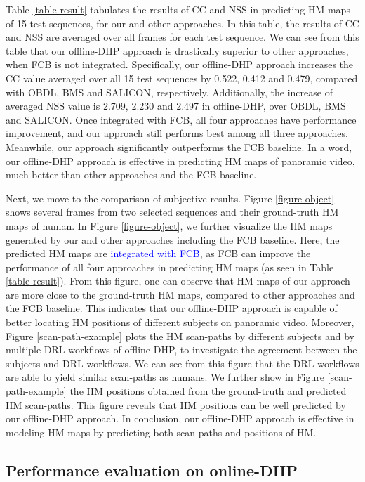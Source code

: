 \documentclass[10pt,journal,compsoc]{IEEEtran}
\begin{document}
Table \ref{table-result} tabulates the results of CC and NSS in predicting HM maps of 15 test sequences, for our and other approaches.
In this table, the results of CC and NSS are averaged over all frames for each test sequence.
We can see from this table that our offline-DHP approach is drastically superior to other approaches, when FCB is not integrated.
Specifically, our  offline-DHP approach increases the CC value averaged over all 15 test sequences by 0.522, 0.412 and 0.479, compared with OBDL, BMS and SALICON, respectively.
Additionally, the increase of averaged NSS value is 2.709, 2.230 and 2.497 in offline-DHP, over OBDL, BMS and SALICON.
Once integrated with FCB, all four approaches have performance improvement, and our approach still performs best among all three approaches. Meanwhile, our approach significantly outperforms the FCB baseline.
In a word, our offline-DHP approach is effective in predicting HM maps of panoramic video, much better than other approaches and the FCB baseline.


Next, we move to the comparison of subjective results. Figure \ref{figure-object} shows several frames from two selected sequences and their ground-truth HM maps of human.
In Figure \ref{figure-object}, we further visualize the HM maps generated by our and other approaches including the FCB baseline. Here, the predicted HM maps are \textcolor{blue}{integrated with FCB}, as FCB can improve the performance of all four approaches in predicting HM maps (as seen in Table \ref{table-result}).
From this figure, one can observe that HM maps of our approach are more close to the ground-truth HM maps, compared to other approaches and the FCB baseline.
This indicates that our offline-DHP approach is capable of better locating HM positions of different subjects on panoramic video.
Moreover, Figure \ref{scan-path-example} plots the HM scan-paths by different subjects and by multiple DRL workflows of offline-DHP, to investigate the agreement between the subjects and DRL workflows.
We can see from this figure that the DRL workflows are able to yield similar scan-paths as humans.  We further show in Figure \ref{scan-path-example} the HM positions obtained from the ground-truth and predicted HM scan-paths. This figure reveals that HM positions can be well predicted by our offline-DHP approach. In conclusion, our offline-DHP approach is effective in modeling HM maps by predicting both scan-paths and positions of HM.



\subsection{Performance evaluation on online-DHP}\label{sec:evaluation_online}
\label{online-compare}
\end{document}

